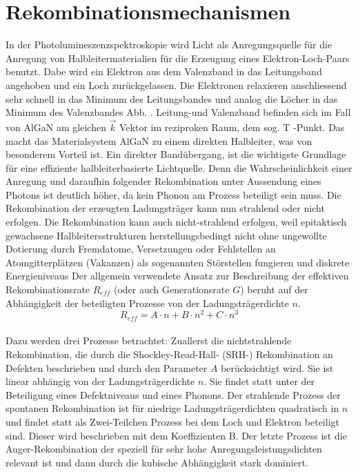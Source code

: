 
\thispagestyle{fancy}


\section{Rekombinationsmechanismen}

In der Photolumineszenzspektroskopie wird Licht als Anregungsquelle für die Anregung von Halbleitermaterialien für die Erzeugung eines Elektron-Loch-Paars benutzt. Dabe wird ein Elektron aus dem Valenzband in das Leitungsband angehoben und ein Loch zurückgelassen. Die Elektronen relaxieren anschliessend sehr schnell in das Minimum des Leitungsbandes und analog die Löcher in das Minimum des Valenzbandes Abb. . Leitung-und Valenzband befinden sich im Fall von AlGaN am gleichen $\vec{k}$ Vektor im reziproken Raum, dem sog. $\mathrm{T}$ -Punkt. Das macht das Materialsystem AlGaN zu einem direkten Halbleiter, was von besonderem Vorteil ist. Ein direkter Bandübergang, ist die wichtigste Grundlage für eine effiziente halbleiterbasierte Lichtquelle. Denn die Wahrscheinlichkeit einer Anregung und daraufhin folgender Rekombination unter Aussendung eines Photons ist deutlich höher, da kein Phonon am Prozess beteiligt sein muss. Die Rekombination der erzeugten Ladungsträger kann nun strahlend oder nicht erfolgen.
Die Rekombination kann auch nicht-strahlend erfolgen, weil epitaktisch gewachsene Halbleitersstrukturen herstellungsbedingt nicht ohne ungewollte Dotierung durch Fremdatome, Versetzungen oder Fehlstellen an Atomgitterplätzen (Vakanzen) als sogenannten Störstellen fungieren und diskrete Energieniveaus 
Der allgemein verwendete Ansatz zur Beschreibung der effektiven Rekombinationsrate $R_{eff}$ (oder auch Generationsrate $G$) beruht auf der Abhängigkeit der beteiligten Prozesse von der Ladungsträgerdichte $n$. 
\\
\begin{equation}
    R_{eff} = A \cdot n + B \cdot n^2 + C \cdot n^3 
\end{equation}
\\
Dazu werden drei Prozesse betrachtet: Zuallerst die nichtstrahlende Rekombination, die durch die Shockley-Read-Hall- (SRH-) Rekombination an Defekten beschrieben und durch den Parameter $A$ berücksichtigt wird. Sie ist linear abhängig von der Ladungsträgerdichte $n$. Sie findet statt unter der Beteiligung eines Defektniveaus und eines Phonons. Der strahlende Prozess der spontanen Rekombination ist für niedrige Ladungsträgerdichten quadratisch in $n$ und findet statt als Zwei-Teilchen Prozess bei dem Loch und Elektron beteiligt sind. Dieser wird beschrieben mit dem Koeffizienten B. 
Der letzte Prozess ist die Auger-Rekombination der speziell für sehr hohe Anregungsleistungsdichten relevant ist und dann durch die kubische Abhängigkeit stark dominiert. 